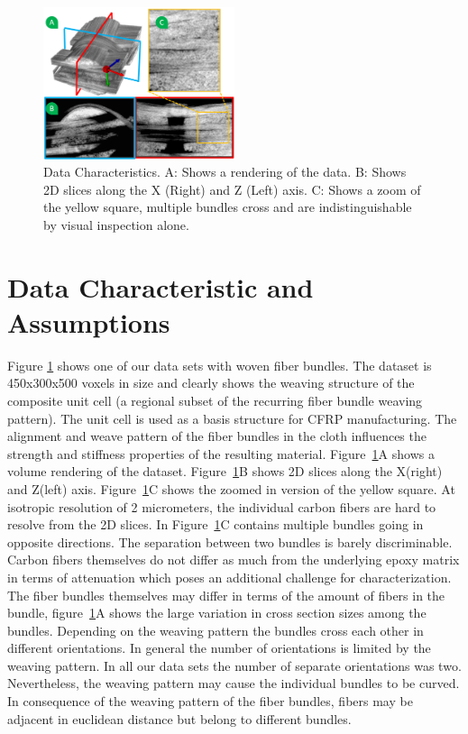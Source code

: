 \begin{figure}
\includegraphics[width=0.5\textwidth,clip=true, trim= 0cm 0cm 0cm 0cm]{imagesMT2014/MT_data_4_2.png}
\caption{Data Characteristics. A: Shows a rendering of the data. B: Shows 2D slices along the X (Right) and Z (Left) axis. C: Shows a zoom of the yellow square, multiple bundles cross and are indistinguishable by visual inspection alone. }
\label{fig:data-char}
\end{figure}
\section {Data Characteristic and Assumptions}
\label{sec:char_data}

Figure \ref{fig:data-char} shows one of our data sets with woven fiber bundles. The dataset is 450x300x500 voxels in size and clearly shows the weaving structure of the composite unit cell (a regional subset of the recurring fiber bundle weaving pattern). The unit cell is used as a basis structure for CFRP manufacturing. The alignment and weave pattern of the fiber bundles in the cloth influences the strength and stiffness properties of the resulting material. Figure~\ref{fig:data-char}A shows a volume rendering of the dataset. Figure~\ref{fig:data-char}B shows 2D slices along the X(right) and Z(left) axis. Figure~\ref{fig:data-char}C shows the zoomed in version of the yellow square. At isotropic resolution of 2 micrometers, the individual carbon fibers are hard to resolve from the 2D slices. In Figure~\ref{fig:data-char}C contains multiple bundles going in opposite directions. The separation between two bundles is barely discriminable.
Carbon fibers themselves do not differ as much from the underlying epoxy matrix in terms of attenuation which poses an additional challenge for characterization. 
The fiber bundles themselves may differ in terms of the amount of fibers in the bundle, figure~\ref{fig:data-char}A shows the large variation in cross section sizes among the bundles.
Depending on the weaving pattern the bundles cross each other in different orientations. 
In general the number of orientations is limited by the weaving pattern. In all our data sets the number of separate orientations was two. Nevertheless, the weaving pattern may cause the individual bundles to be curved. 
In consequence of the weaving pattern of the fiber bundles, fibers may be adjacent in euclidean distance but belong to different bundles. 
 

